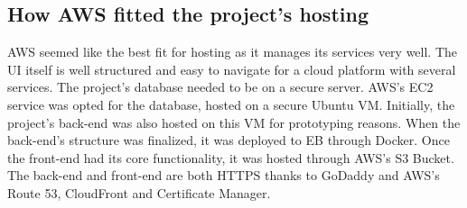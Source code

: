 \subsection{How AWS fitted the project's hosting}
AWS seemed like the best fit for hosting as it manages its services very well. The UI itself is well structured and easy to navigate for a cloud platform with several services. The project's database needed to be on a secure server. AWS's EC2 service was opted for the database, hosted on a secure Ubuntu VM. Initially, the project's back-end was also hosted on this VM for prototyping reasons. When the back-end's structure was finalized, it was deployed to EB through Docker. Once the front-end had its core functionality, it was hosted through AWS's S3 Bucket. The back-end and front-end are both HTTPS thanks to GoDaddy and AWS's Route 53, CloudFront and Certificate Manager.

